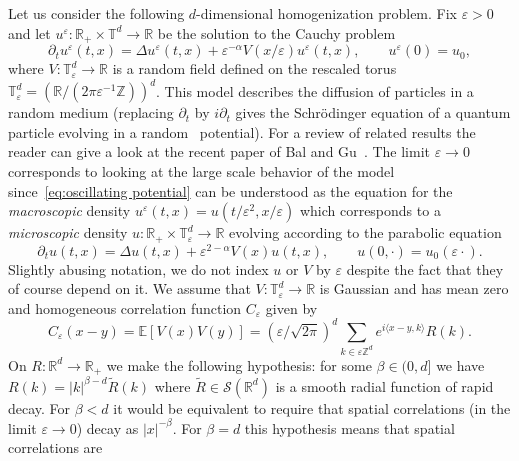 \documentclass[a4paper,11pt]{article}
\newcommand{\cdummy}{\cdot}
\newcommand{\tmem}[1]{{\em #1\/}}
\newcommand{\CS}{\mathscr{S}}
\begin{document}
Let us consider the following $d$-dimensional homogenization problem. Fix
$\varepsilon > 0$ and let $u^{\varepsilon} : \mathbb{R}_+ \times
\mathbb{T}^d \rightarrow \mathbb{R}$ be the solution to the Cauchy problem
\begin{equation}\label{eq:oscillating potential}
   \partial_t u^{\varepsilon} (t, x) = \Delta u^{\varepsilon} (t, x) +
   \varepsilon^{- \alpha} V (x / \varepsilon) u^{\varepsilon} (t, x),
   \hspace{2em} u^{\varepsilon} (0) = u_0,
\end{equation}
where $V : \mathbb{T}^d_{\varepsilon} \rightarrow \mathbb{R}$ is a random
field defined on the rescaled torus $\mathbb{T}^d_{\varepsilon} =
(\mathbb{R}/ (2 \pi \varepsilon^{- 1} \mathbb{Z}))^d$. This model describes
the diffusion of particles in a random medium (replacing $\partial_t$ by $i
\partial_t$ gives the Schr{\"o}dinger equation of a quantum particle evolving
in a random \ potential). For a review of related results the reader can give
a look at the recent paper of Bal and Gu~{\cite{bal_limiting_2013}}. The limit
$\varepsilon \rightarrow 0$ corresponds to looking at the large scale behavior
of the model since~\eqref{eq:oscillating potential} can be understood as the equation for the
{\tmem{macroscopic}} density $u^{\varepsilon} (t, x) = u (t / \varepsilon^2, x
/ \varepsilon)$ which corresponds to a {\tmem{microscopic}} density $u :
\mathbb{R}_+ \times \mathbb{T}_{\varepsilon}^d \rightarrow \mathbb{R}$
evolving according to the parabolic equation
\[ \partial_t u (t, x) = \Delta u (t, x) + \varepsilon^{2 - \alpha} V (x) u
   (t, x), \hspace{2em} u (0, \cdummy) = u_0 (\varepsilon
   \cdummy). \]
Slightly abusing notation, we do not index $u$ or $V$ by $\varepsilon$ despite the fact that they of course depend on it.   
We assume that $V \colon \mathbb{T}^d_{\varepsilon} \rightarrow \mathbb{R}$ is
Gaussian and has mean zero and homogeneous correlation function
$C_{\varepsilon}$ given by
\[ C_{\varepsilon} (x - y) =\mathbb{E} [V (x) V (y)] = ( \varepsilon /
   \sqrt{2 \pi} )^d \sum_{k \in \varepsilon \mathbb{Z}^d} e^{i
   \langle x - y, k \rangle} R (k). \]
On $R \colon\mathbb{R}^d \rightarrow \mathbb{R}_+$ we make the following hypothesis: for
some $\beta \in (0, d]$ we have $R (k) = | k |^{\beta - d} \tilde{R} (k)$
where $\tilde{R} \in \CS (\mathbb{R}^d)$ is a smooth radial function of rapid
decay. For $\beta < d$ it would be equivalent to require that spatial
correlations (in the limit $\varepsilon \rightarrow 0$) decay as $| x |^{-
\beta}$. For $\beta = d$ this hypothesis means that spatial correlations are
\end{document}

